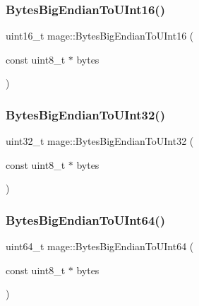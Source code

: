 \hypertarget{namespacemage_a90b2972b7a2a01d4a911d071303bc400}{}\label{namespacemage_a90b2972b7a2a01d4a911d071303bc400} 
\subsubsection{\texorpdfstring{Bytes\+Big\+Endian\+To\+U\+Int16()}{BytesBigEndianToUInt16()}}
{\footnotesize\ttfamily uint16\+\_\+t mage\+::\+Bytes\+Big\+Endian\+To\+U\+Int16 (\begin{DoxyParamCaption}\item[{const uint8\+\_\+t $\ast$}]{bytes }\end{DoxyParamCaption})}

\hypertarget{namespacemage_aab7d431dcaf0965028de7c5dee9c3da4}{}\label{namespacemage_aab7d431dcaf0965028de7c5dee9c3da4} 
\subsubsection{\texorpdfstring{Bytes\+Big\+Endian\+To\+U\+Int32()}{BytesBigEndianToUInt32()}}
{\footnotesize\ttfamily uint32\+\_\+t mage\+::\+Bytes\+Big\+Endian\+To\+U\+Int32 (\begin{DoxyParamCaption}\item[{const uint8\+\_\+t $\ast$}]{bytes }\end{DoxyParamCaption})}

\hypertarget{namespacemage_a7509f9c1a6cf98056f2deaa8a2f45c7c}{}\label{namespacemage_a7509f9c1a6cf98056f2deaa8a2f45c7c} 
\subsubsection{\texorpdfstring{Bytes\+Big\+Endian\+To\+U\+Int64()}{BytesBigEndianToUInt64()}}
{\footnotesize\ttfamily uint64\+\_\+t mage\+::\+Bytes\+Big\+Endian\+To\+U\+Int64 (\begin{DoxyParamCaption}\item[{const uint8\+\_\+t $\ast$}]{bytes }\end{DoxyParamCaption})}

